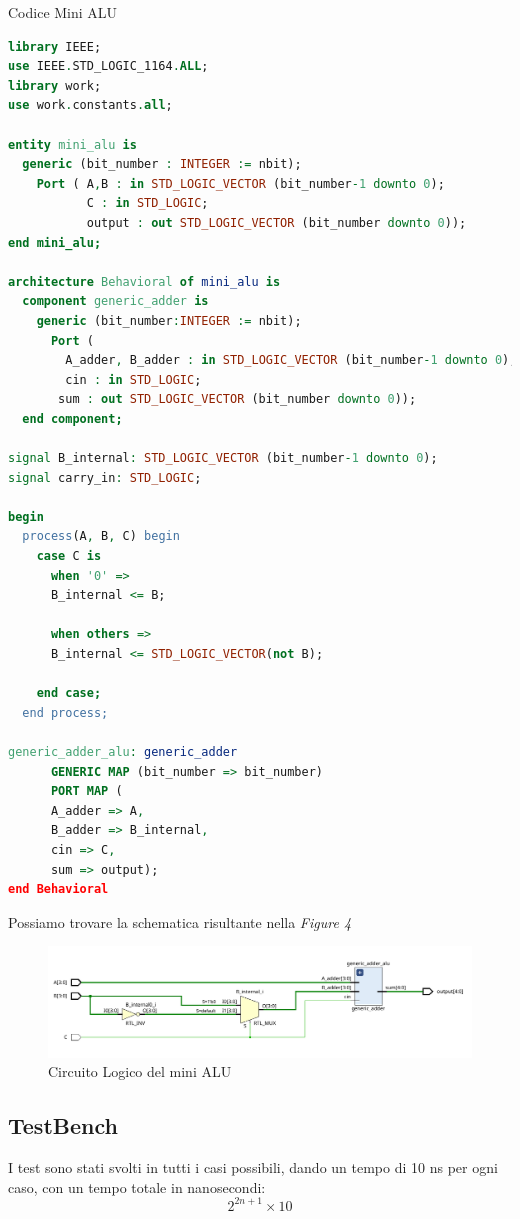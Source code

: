 \begin{problem}{Codice Mini ALU}{}
\begin{lstlisting}[language=VHDL]
library IEEE;
use IEEE.STD_LOGIC_1164.ALL;
library work;
use work.constants.all;

entity mini_alu is
  generic (bit_number : INTEGER := nbit);
    Port ( A,B : in STD_LOGIC_VECTOR (bit_number-1 downto 0);
           C : in STD_LOGIC;
           output : out STD_LOGIC_VECTOR (bit_number downto 0));
end mini_alu;

architecture Behavioral of mini_alu is
  component generic_adder is
    generic (bit_number:INTEGER := nbit);
      Port ( 
        A_adder, B_adder : in STD_LOGIC_VECTOR (bit_number-1 downto 0);
        cin : in STD_LOGIC;
       sum : out STD_LOGIC_VECTOR (bit_number downto 0));
  end component;

signal B_internal: STD_LOGIC_VECTOR (bit_number-1 downto 0);
signal carry_in: STD_LOGIC;

begin
  process(A, B, C) begin
    case C is
      when '0' => 
      B_internal <= B;
            
      when others =>
      B_internal <= STD_LOGIC_VECTOR(not B);

    end case;
  end process;

generic_adder_alu: generic_adder 
      GENERIC MAP (bit_number => bit_number)
      PORT MAP (
      A_adder => A,
      B_adder => B_internal,
      cin => C,
      sum => output);
end Behavioral
\end{lstlisting}
\end{problem}

Possiamo trovare la schematica risultante nella \textit{Figure 4}
\begin{figure}[ht]
    \centering
    \includegraphics[width=15cm]{assets/schematics/generic_alu.png}
    \caption{Circuito Logico del mini ALU}
\end{figure}

\subsection{TestBench}
I test sono stati svolti in tutti i casi possibili, dando un tempo di 10 ns per ogni caso, con un tempo totale in nanosecondi: \begin{equation}2^{2n+1} \times 10\end{equation}

